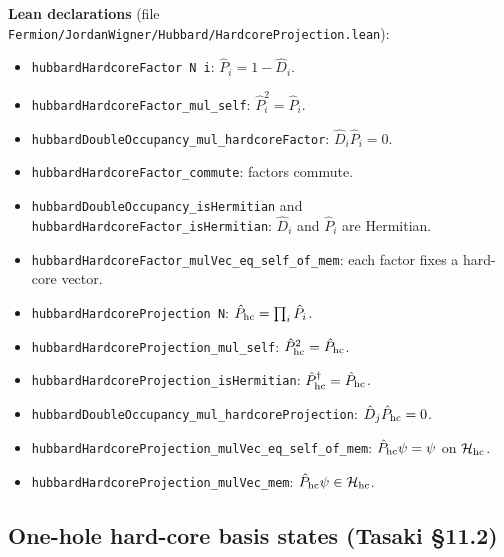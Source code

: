 \documentclass[a4paper,11pt]{article}
\begin{document}
\medskip
\noindent\textbf{Lean declarations}
(file \texttt{Fermion/JordanWigner/Hubbard/HardcoreProjection.lean}):
\begin{itemize}
  \item \texttt{hubbardHardcoreFactor N i}: \(\hat P_i = 1 - \hat D_i\).
  \item \texttt{hubbardHardcoreFactor\_mul\_self}: \(\hat P_i^2 = \hat P_i\).
  \item \texttt{hubbardDoubleOccupancy\_mul\_hardcoreFactor}:
    \(\hat D_i\hat P_i = 0\).
  \item \texttt{hubbardHardcoreFactor\_commute}: factors commute.
  \item \texttt{hubbardDoubleOccupancy\_isHermitian} and
    \texttt{hubbardHardcoreFactor\_isHermitian}: \(\hat D_i\) and
    \(\hat P_i\) are Hermitian.
  \item \texttt{hubbardHardcoreFactor\_mulVec\_eq\_self\_of\_mem}:
    each factor fixes a hard-core vector.
  \item \texttt{hubbardHardcoreProjection N}:
    \(\hat P_{\rm hc} = \prod_i \hat P_i\).
  \item \texttt{hubbardHardcoreProjection\_mul\_self}:
    \(\hat P_{\rm hc}^2 = \hat P_{\rm hc}\).
  \item \texttt{hubbardHardcoreProjection\_isHermitian}:
    \(\hat P_{\rm hc}^\dagger = \hat P_{\rm hc}\).
  \item \texttt{hubbardDoubleOccupancy\_mul\_hardcoreProjection}:
    \(\hat D_j\hat P_{\rm hc} = 0\).
  \item \texttt{hubbardHardcoreProjection\_mulVec\_eq\_self\_of\_mem}:
    \(\hat P_{\rm hc}\psi=\psi\) on \(\mathcal H_{\rm hc}\).
  \item \texttt{hubbardHardcoreProjection\_mulVec\_mem}:
    \(\hat P_{\rm hc}\psi\in\mathcal H_{\rm hc}\).
\end{itemize}

\subsection{One-hole hard-core basis states (Tasaki §11.2)}
\label{subsec:hubbard-hardcore-basis}
\end{document}
